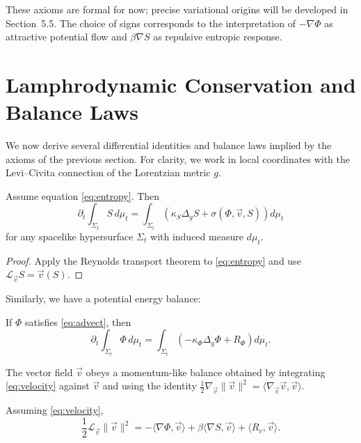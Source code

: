These axioms are formal for now; precise variational origins will be
developed in Section~5.5. The choice of signs corresponds to the
interpretation of $-\nabla\Phi$ as attractive potential flow and
$\beta\nabla S$ as repulsive entropic response.


\section{Lamphrodynamic Conservation and Balance Laws}

We now derive several differential identities and balance laws implied
by the axioms of the previous section. For clarity, we work in local
coordinates with the Levi--Civita connection of the Lorentzian metric $g$.

\begin{proposition}
Assume equation \eqref{eq:entropy}. Then
\begin{equation}
\partial_t \int_{\Sigma_t} S \, d\mu_t
= \int_{\Sigma_t} \left( \kappa_{S}\Delta_g S
  + \sigma(\Phi,\vec v,S) \right) d\mu_t
\end{equation}
for any spacelike hypersurface $\Sigma_t$ with induced measure $d\mu_t$.
\end{proposition}

\begin{proof}[Proof]
Apply the Reynolds transport theorem to \eqref{eq:entropy} and use
$\mathcal{L}_{\vec v}S = \vec v(S)$.
\end{proof}

Similarly, we have a potential energy balance:

\begin{proposition}
If $\Phi$ satisfies \eqref{eq:advect}, then
\begin{equation}
\partial_t \int_{\Sigma_t} \Phi \, d\mu_t
= \int_{\Sigma_t}
\left( -\kappa_{\Phi}\Delta_g \Phi + R_{\Phi} \right) d\mu_t.
\end{equation}
\end{proposition}

The vector field $\vec v$ obeys a momentum-like balance obtained by
integrating \eqref{eq:velocity} against $\vec v$ and using the identity
$\frac12\nabla_{\vec v}\|\vec v\|^2 = \langle\nabla_{\vec v}\vec v,\vec v\rangle$.

\begin{proposition}
Assuming \eqref{eq:velocity},
\begin{equation}
\frac12 \mathcal{L}_{\vec v}\|\vec v\|^2 =
-\langle\nabla\Phi,\vec v\rangle
+ \beta\langle\nabla S,\vec v\rangle
+ \langle R_{v},\vec v\rangle.
\end{equation}
\end{proposition}

